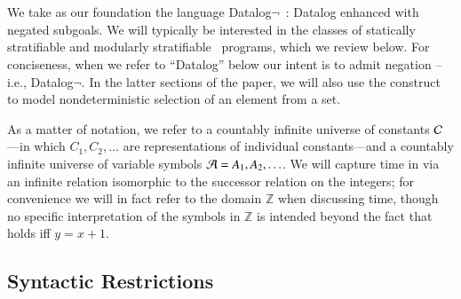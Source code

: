 \section{\large \bf \slang}
We take as our foundation the language Datalog$\lnot$~\cite{ullmanbook}: Datalog enhanced with negated subgoals.  We will typically be interested in the
classes of statically stratifiable 
and modularly stratifiable~\cite{modular} programs, which we review below.  For conciseness, when we refer to ``Datalog'' below our intent is to admit negation -- i.e., Datalog$\lnot$.  In the latter sections of the paper, we will also use
the  construct~\cite{greedychoice, eventchoice} to model
nondeterministic selection of an element from a set.  

As a matter of notation, we refer to a countably infinite universe of constants
$\Consts$---in which $C_{1}, C_{2}, \ldots$ are representations of individual
constants---and a countably infinite universe of variable symbols $\Vars = A_1,
A_2, \ldots$.
We will capture time in \slang via an infinite relation  isomorphic to the successor relation on the integers; for convenience we will in fact refer to the domain $\mathbb{Z}$ when discussing time, though no specific interpretation of the symbols in $\mathbb{Z}$ is intended beyond the fact that  holds iff $y = x + 1$.


\subsection{Syntactic Restrictions}
\label{sec:syntaxrestrictions}

